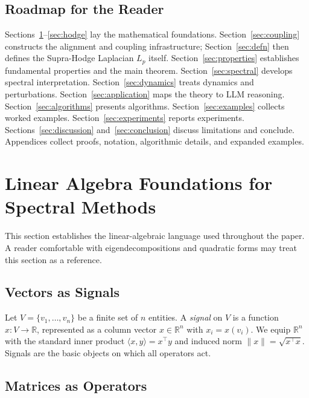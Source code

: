 \documentclass[11pt]{article}
\theoremstyle{definition}
\theoremstyle{remark}
\newcommand{\R}{\mathbb{R}}
\begin{document}
\subsection{Roadmap for the Reader}

Sections~\ref{sec:linalg}--\ref{sec:hodge} lay the mathematical foundations.
Section~\ref{sec:coupling} constructs the alignment and coupling infrastructure;
Section~\ref{sec:defn} then defines the Supra-Hodge Laplacian $L_p$ itself.
Section~\ref{sec:properties} establishes fundamental properties and the main
theorem. Section~\ref{sec:spectral} develops spectral interpretation.
Section~\ref{sec:dynamics} treats dynamics and perturbations.
Section~\ref{sec:application} maps the theory to LLM reasoning.
Section~\ref{sec:algorithms} presents algorithms. Section~\ref{sec:examples}
collects worked examples. Section~\ref{sec:experiments} reports experiments.
Sections~\ref{sec:discussion} and~\ref{sec:conclusion} discuss limitations and
conclude. Appendices collect proofs, notation, algorithmic details, and expanded
examples.


\section{Linear Algebra Foundations for Spectral Methods}
\label{sec:linalg}

This section establishes the linear-algebraic language used throughout the
paper. A reader comfortable with eigendecompositions and quadratic forms may
treat this section as a reference.

\subsection{Vectors as Signals}

Let $V = \{v_1,\dots,v_n\}$ be a finite set of $n$ entities. A \emph{signal}
on $V$ is a function $x\colon V \to \R$, represented as a column vector
$x \in \R^n$ with $x_i = x(v_i)$. We equip $\R^n$ with the standard inner
product $\langle x, y\rangle = x^\top y$ and induced norm $\|x\| =
\sqrt{x^\top x}$. Signals are the basic objects on which all operators act.

\subsection{Matrices as Operators}
\end{document}
